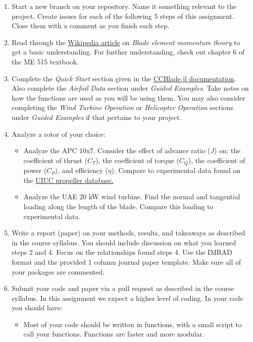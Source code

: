 \documentclass[12pt]{article}
\begin{document}
	\begin{enumerate}
		\item Start a new branch on your repository. Name it something relevant to the project. Create issues for each of the following 5 steps of this assignment. Close them with a comment as you finish each step. 
		\item Read  through the \href{https://en.wikipedia.org/wiki/Blade_element_momentum_theory}{Wikipedia article} on \textit{Blade element momentum theory} to get a basic understanding. For further understanding, check out chapter 6 of the ME 515 textbook. 
		\item Complete the \textit{Quick Start} section given in the \href{https://flow.byu.edu/CCBlade.jl/stable/}{CCBlade.jl documentation}. Also complete the \textit{Airfoil Data} section under \textit{Guided Examples}. Take notes on how the functions are used as you will be using them.  You may also consider completing the \textit{Wind Turbine Operation} or \textit{Helicopter Operation} sections under \textit{Guided Examples} if that pertains to your project. 
		\item Analyze a rotor of your choice:
		\begin{itemize}
			\item Analyze the APC 10x7. Consider the effect of advance ratio ($J$) on: the coefficient of thrust ($C_T$), the coefficient of torque ($C_Q$), the coefficient of power ($C_P$), and efficiency ($\eta$).  Compare to experimental data found on the \href{https://m-selig.ae.illinois.edu/props/propDB.html}{UIUC propeller database.} 
			\item Analyze the UAE 20 kW wind turbine. Find the normal and tangential loading along the length of the blade. Compare this loading to experimental data.  %
		\end{itemize}
		\item Write a report (paper) on your methods, results, and takeaways as described in the course syllabus. You should include discussion on what you learned steps 2 and 4.  Focus on the relationships found steps 4.  Use the IMRAD format and the provided 1 column journal paper template. Make sure all of your packages are commented. 
		\item Submit your code and paper via a pull request as described in the course syllabus. In this assignment we expect a higher level of coding. In your code you should have: 
		\begin{itemize}
			\item Most of your code should be written in functions, with a small script to call your functions. Functions are faster and more modular. 

\end{itemize}
\end{enumerate}
\end{document}
